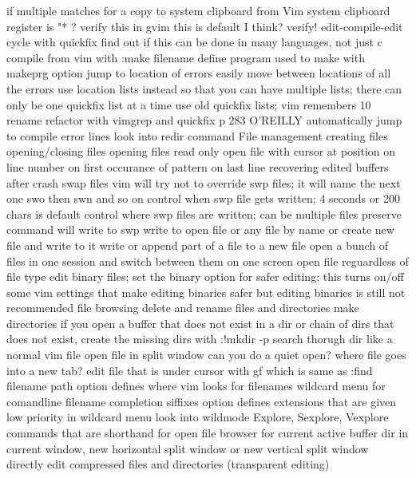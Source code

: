 \documentclass[12pt]{book}
\begin{document}
{{    if multiple matches for a
  copy to system clipboard from Vim
    system clipboard register is "* ?  verify this
    in gvim this is default I think? verify!
  edit-compile-edit cycle with quickfix
    find out if this can be done in many languages, not just c
    compile from vim with :make filename
    define program used to make with makeprg option
    jump to location of errors
    easily move between locations of all the errors
    use location lists instead so that you can have multiple lists; there can only be one quickfix list at a time
    use old quickfix lists; vim remembers 10
  rename refactor with vimgrep and quickfix
    p 283 O'REILLY
  automatically jump to compile error lines
    look into redir command
  File management
    creating files
    opening/closing files
    opening files read only
    open file with cursor at position
      on line number
      on first occurance of pattern
      on last line
    recovering edited buffers after crash
      swap files
      vim will try not to override swp files; it will name the next one swo then swn and so on
      control when swp file gets written; 4 seconds or 200 chars is default
      control where swp files are written; can be multiple files
      preserve command will write to swp
    write to open file or any file by name or create new file and write to it
    write or append part of a file to a new file
    open a bunch of files in one session and switch between them on one screen
    open file reguardless of file type
      edit binary files; set the binary option for safer editing; this turns on/off some vim settings that make editing binaries safer but editing binaries is still not recommended
    file browsing
      delete and rename files and directories
      make directories
        if you open a buffer that does not exist in a dir or chain of dirs that does not exist, create the missing dirs with :!mkdir -p %
      search thorugh dir like a normal vim file
      open file in split window
      can you do a quiet open? where file goes into a new tab?
      edit file that is under cursor with gf which is same as :find filename
        path option defines where vim looks for filenames
      wildcard menu for comandline filename completion
        siffixes option defines extensions that are given low priority in wildcard menu
        look into wildmode
      Explore, Sexplore, Vexplore
        commands that are shorthand for open file browser for current active buffer dir in current window, new horizontal split window or new vertical split window
    directly edit compressed files and directories (transparent editing)
}}
\end{document}
